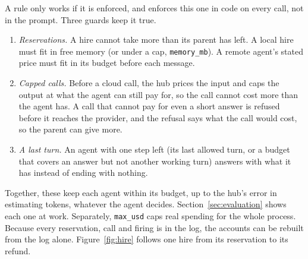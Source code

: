 A rule only works if it is enforced, and \sys{} enforces this one in code on every call, not in the prompt. Three
guards keep it true.
\begin{enumerate}[label=(\arabic*)]
  \item \emph{Reservations.} A hire cannot take more than its parent has left. A local hire must fit in free memory (or
  under a cap, \texttt{memory\_mb}). A remote agent's stated price must fit in its budget before each message.
  \item \emph{Capped calls.} Before a cloud call, the hub prices the input and caps the output at what the agent can
  still pay for, so the call cannot cost more than the agent has. A call that cannot pay for even a short answer is
  refused before it reaches the provider, and the refusal says what the call would cost, so the parent can give more.
  \item \emph{A last turn.} An agent with one step left (its last allowed turn, or a budget that covers an answer but
  not another working turn) answers with what it has instead of ending with nothing.
\end{enumerate}
Together, these keep each agent within its budget, up to the hub's error in estimating tokens, whatever the agent
decides. Section~\ref{sec:evaluation} shows each one at work. Separately, \texttt{max\_usd} caps real spending for the
whole process. Because every reservation, call and firing is in the log, the accounts can be rebuilt from the log alone.
Figure~\ref{fig:hire} follows one hire from its reservation to its refund.

